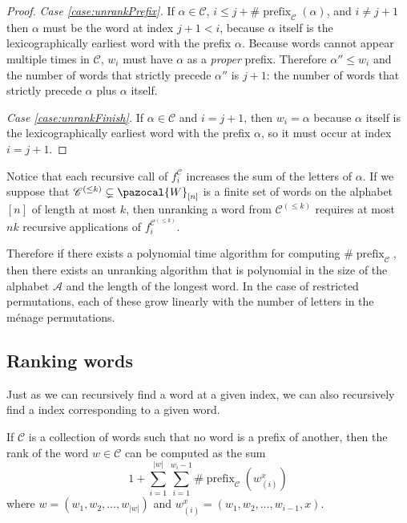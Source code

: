 \begin{proof}
  \textit{Case \eqref{case:unrankPrefix}.}
  If $\alpha \in \mathcal C$,
  $i \leq j + \#\operatorname{prefix}_\mathcal{C}(\alpha)$, and
  $i \neq j + 1$ then $\alpha$ must be the word at index $j + 1 < i$,
  because $\alpha$ itself is the lexicographically earliest word with the prefix
  $\alpha$. Because words cannot appear multiple times in $\mathcal{C}$, $w_i$
  must have $\alpha$ as a \textit{proper} prefix.
  Therefore $\alpha'' \leq w_i$ and
  the number of words that strictly precede $\alpha''$ is $j + 1$:
  the number of words that strictly precede $\alpha$ plus $\alpha$ itself.

  \textit{Case \eqref{case:unrankFinish}.}
  If $\alpha \in \mathcal{C}$ and $i = j + 1$, then
  $w_i = \alpha$ because $\alpha$ itself is the lexicographically earliest word
  with the prefix $\alpha$, so it must occur at index $i = j + 1$.
\end{proof}

Notice that each recursive call of $f_i^\mathcal{C}$ increases the sum of the
letters of $\alpha$. If we suppose that
$\mathcal{C}^{(\leq k)} \subsetneq \pazocal{W}_{[n]}$
is a finite set of words on the alphabet $[n]$ of length at most $k$, then unranking
a word from $\mathcal{C}^{(\leq k)}$ requires at most $nk$ recursive
applications of $f_i^{\mathcal{C}^{(\leq k)}}$.

Therefore
if there exists a polynomial time algorithm for computing
$\#\operatorname{prefix}_{\mathcal{C}}$, then there exists an unranking
algorithm that is polynomial in the size of the alphabet $\mathcal A$ and the
length of the longest word. In the case of restricted permutations, each of
these grow linearly with the number of letters in the m\'enage permutations.

\subsection{Ranking words}
Just as we can recursively find a word at a given index, we can also
recursively find a index corresponding to a given word.

\begin{claim} If $\mathcal{C}$ is a collection of words such that no word is a
  prefix of another, then the rank of the word $w \in \mathcal{C}$ can
  be computed as the sum \[
    1 + \sum_{i=1}^{|w|} \sum_{i = 1}^{w_i - 1} \#\operatorname{prefix}_\mathcal{C}(w_{(i)}^x)
  \]
  where $w = (w_1, w_2, \dots, w_{|w|})$ and $w_{(i)}^x = (w_1, w_2, \dots, w_{i-1}, x)$.
\end{claim}

